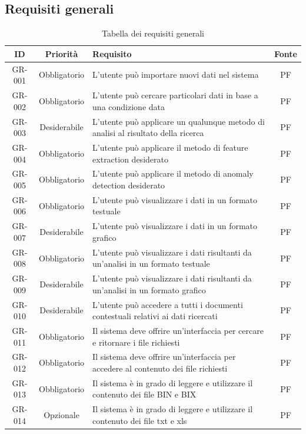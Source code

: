 \subsection{Requisiti generali}
\begin{table} [H]
	\centering
	\begin{tabularx}{\textwidth}{|c c X c|} 
		\hline
		ID & Priorità & Requisito & Fonte \\ [0.5ex] 
		\hline\hline
		GR-001 & Obbligatorio & L'utente può importare nuovi dati nel sistema & PF \\ 
		\hline
		GR-002 & Obbligatorio & L'utente può cercare particolari dati in base a una condizione data & PF \\ 
		\hline
		GR-003 & Desiderabile & L'utente può applicare un qualunque metodo di analisi al risultato della ricerca & PF \\ 
		\hline
		GR-004 & Obbligatorio & L'utente può applicare il metodo di feature extraction desiderato & PF \\ 
		\hline
		GR-005 & Obbligatorio & L'utente può applicare il metodo di anomaly detection desiderato & PF \\ 
		\hline
		GR-006 & Obbligatorio & L'utente può visualizzare i dati in un formato testuale & PF \\ 
		\hline
		GR-007 & Desiderabile & L'utente può visualizzare i dati in un formato grafico & PF \\ 
		\hline
		GR-008 & Obbligatorio & L'utente può visualizzare i dati risultanti da un'analisi in un formato testuale & PF \\ 
		\hline
		GR-009 & Desiderabile &L'utente può visualizzare i dati risultanti da un'analisi in un formato grafico & PF \\ 
		\hline
		GR-010 & Desiderabile & L'utente può accedere a tutti i documenti contestuali relativi ai dati ricercati & PF \\ 
		\hline
		GR-011 & Obbligatorio & Il sistema deve offrire un'interfaccia per cercare e ritornare i file richiesti & PF \\ 
		\hline
		GR-012 & Obbligatorio & Il sistema deve offrire un'interfaccia per accedere al contenuto dei file richiesti & PF \\ 
		\hline
		GR-013 & Obbligatorio & Il sistema è in grado di leggere e utilizzare il contenuto dei file BIN e BIX & PF \\ 
		\hline
		GR-014 & Opzionale & Il sistema è in grado di leggere e utilizzare il contenuto dei file txt e xls & PF \\ 
		\hline

	\end{tabularx}
	\caption{Tabella dei requisiti generali}
\end{table}


